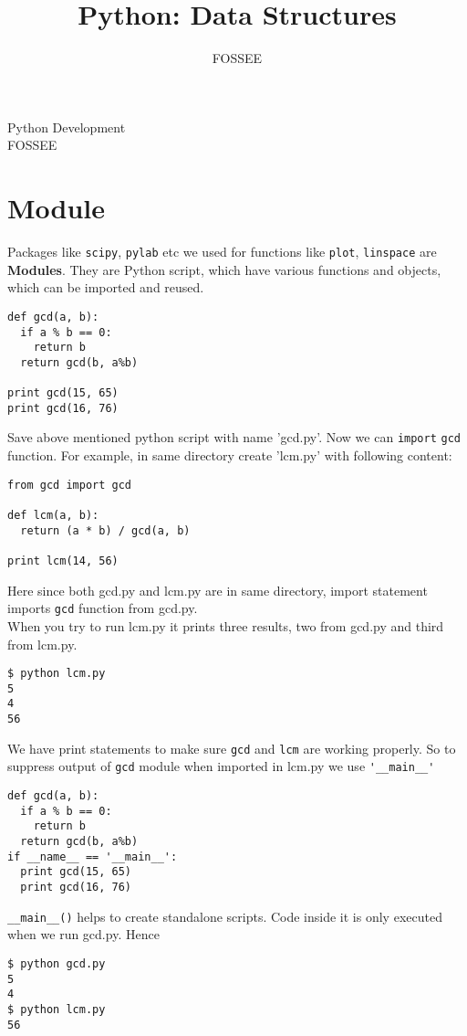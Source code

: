 \documentclass[12pt]{article}
\title{Python: Data Structures}
\author{FOSSEE}
\newcommand{\typ}[1]{\lstinline{#1}}
\begin{document}
\date{}
\vspace{-1in}
\begin{center}
\LARGE{Python Development}\\
\large{FOSSEE}
\end{center}
\section{Module}
Packages like \typ{scipy}, \typ{pylab} etc we used for functions like \typ{plot}, \typ{linspace} are \textbf{Modules}. They are Python script, which have various functions and objects, which can be imported and reused. 
\begin{lstlisting}
def gcd(a, b):
  if a % b == 0: 
    return b
  return gcd(b, a%b)

print gcd(15, 65)
print gcd(16, 76)
\end{lstlisting}
Save above mentioned python script with name 'gcd.py'. Now we can \typ{import} \typ{gcd} function. For example, in same directory create 'lcm.py' with following content:
\begin{lstlisting}
from gcd import gcd    

def lcm(a, b):
  return (a * b) / gcd(a, b)
    
print lcm(14, 56)
\end{lstlisting}
Here since both gcd.py and lcm.py are in same directory, import statement imports \typ{gcd} function from gcd.py.\\
When you try to run lcm.py it prints three results, two from gcd.py and third from lcm.py.
\begin{lstlisting}
$ python lcm.py
5
4
56
\end{lstlisting} %
\newpage
We have print statements to make sure \typ{gcd} and \typ{lcm} are working properly. So to suppress output of \typ{gcd} module when imported in lcm.py we use \typ{'__main__'} \
\begin{lstlisting}
def gcd(a, b):
  if a % b == 0: 
    return b
  return gcd(b, a%b)
if __name__ == '__main__':
  print gcd(15, 65)
  print gcd(16, 76)
\end{lstlisting}
\typ{__main__()} helps to create standalone scripts. Code inside it is only executed when we run gcd.py. Hence
\begin{lstlisting}
$ python gcd.py
5
4
$ python lcm.py 
56
\end{lstlisting}
\end{document}
